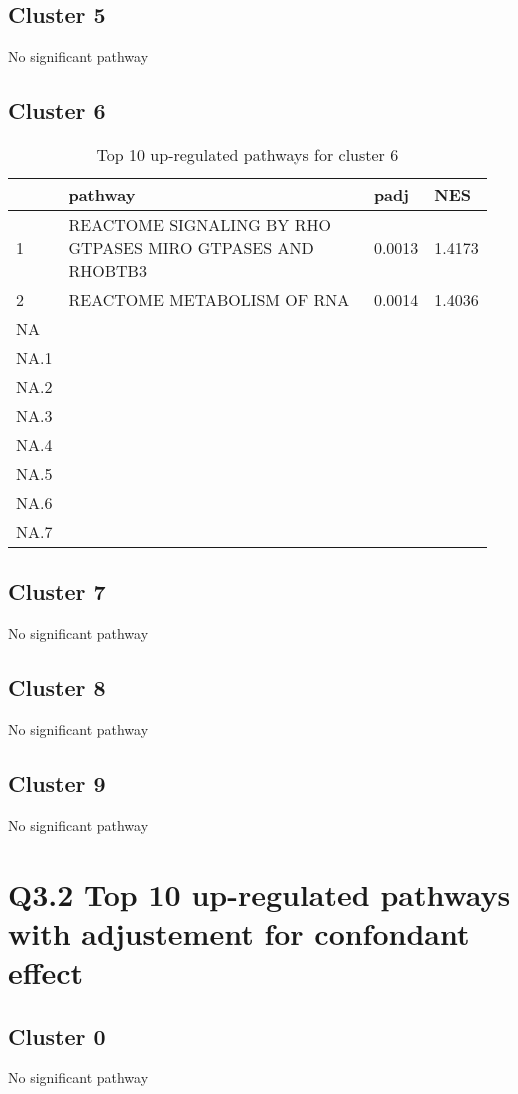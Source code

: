 \documentclass{article}
\begin{document}
\subsection{Cluster 5 }
No significant pathway
\subsection{Cluster 6 }
\begin{table}[H]
\centering
\begin{tabular}{p{0.05\linewidth}p{0.7\linewidth}p{0.1\linewidth}p{0.1\linewidth}}
  \hline
 & pathway & padj & NES \\ 
  \hline
1 & REACTOME SIGNALING BY RHO GTPASES MIRO GTPASES AND RHOBTB3 & 0.0013 & 1.4173 \\ 
  2 & REACTOME METABOLISM OF RNA & 0.0014 & 1.4036 \\ 
  NA &  &  &  \\ 
  NA.1 &  &  &  \\ 
  NA.2 &  &  &  \\ 
  NA.3 &  &  &  \\ 
  NA.4 &  &  &  \\ 
  NA.5 &  &  &  \\ 
  NA.6 &  &  &  \\ 
  NA.7 &  &  &  \\ 
   \hline
\end{tabular}
\caption{Top 10 up-regulated pathways for cluster 6} 
\label{tab:q3_2_6}
\end{table}
\subsection{Cluster 7 }
No significant pathway
\subsection{Cluster 8 }
No significant pathway
\subsection{Cluster 9 }
No significant pathway
\section{Q3.2 Top 10 up-regulated pathways with adjustement for confondant effect}
\subsection{Cluster 0 }
No significant pathway
\end{document}
